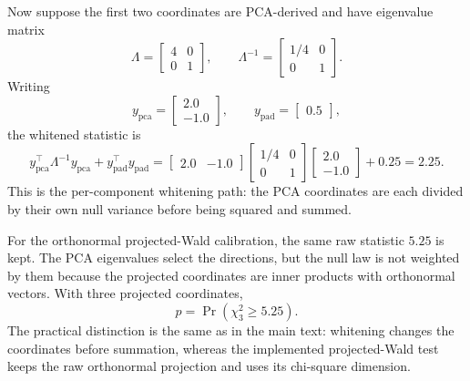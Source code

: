 Now suppose the first two coordinates are PCA-derived and have eigenvalue
matrix
\begin{equation}
\Lambda =
\begin{bmatrix}
4&0\\
0&1
\end{bmatrix},
\qquad
\Lambda^{-1} =
\begin{bmatrix}
1/4&0\\
0&1
\end{bmatrix}.
\end{equation}
Writing
\begin{equation}
y_{\mathrm{pca}} =
\begin{bmatrix}
2.0\\
-1.0
\end{bmatrix},
\qquad
y_{\mathrm{pad}} =
\begin{bmatrix}
0.5
\end{bmatrix},
\end{equation}
the whitened statistic is
\begin{equation}
y_{\mathrm{pca}}^\top \Lambda^{-1} y_{\mathrm{pca}}
+
y_{\mathrm{pad}}^\top y_{\mathrm{pad}}
=
\begin{bmatrix}
2.0 & -1.0
\end{bmatrix}
\begin{bmatrix}
1/4&0\\
0&1
\end{bmatrix}
\begin{bmatrix}
2.0\\
-1.0
\end{bmatrix}
+
0.25
=
2.25.
\end{equation}
This is the per-component whitening path: the PCA coordinates are each divided
by their own null variance before being squared and summed.

For the orthonormal projected-Wald calibration, the same raw statistic $5.25$
is kept. The PCA eigenvalues select the directions, but the null law is not
weighted by them because the projected coordinates are inner products with
orthonormal vectors. With three projected coordinates,
\begin{equation}
p = \Pr\!\left(\chi^2_3 \ge 5.25\right).
\end{equation}
The practical distinction is the same as in the main text: whitening changes
the coordinates before summation, whereas the implemented projected-Wald test
keeps the raw orthonormal projection and uses its chi-square dimension.
